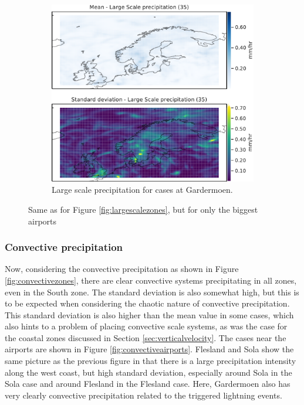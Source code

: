 \begin{figure}[H]
    \begin{subfigure}[b]{0.5\textwidth}
    \centering
    \includegraphics[width=\textwidth]{Figures/lsPENGM.pdf}
    \caption{Large scale precipitation for cases at Gardermoen.}
    \label{fig:ENGMlsP}
\end{subfigure}
\caption{Same as for Figure \ref{fig:largescalezones}, but for only the biggest airports}
\label{fig:largescaleairports}
\end{figure}

\subsubsection{Convective precipitation}
Now, considering the convective precipitation as shown in Figure \ref{fig:convectivezones}, there are clear convective systems precipitating in all zones, even in the South zone. The standard deviation is also somewhat high, but this is to be expected when considering the chaotic nature of convective precipitation. This standard deviation is also higher than the mean value in some cases, which also hints to a problem of placing convective scale systems, as was the case for the coastal zones discussed in Section \ref{sec:verticalvelocity}. The cases near the airports are shown in Figure \ref{fig:convectiveairports}. Flesland and Sola show the same picture as the previous figure in that there is a large precipitation intensity along the west coast, but high standard deviation, especially around Sola in the Sola case and around Flesland in the Flesland case. Here, Gardermoen also has very clearly convective precipitation related to the triggered lightning events. 

